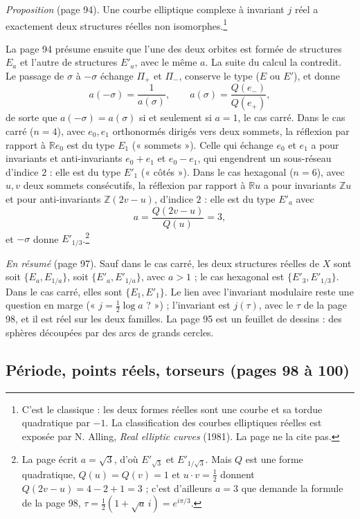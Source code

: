 \documentclass[11pt,a4paper]{article}
\begin{document}
\emph{Proposition} (page 94). Une courbe elliptique complexe à invariant $j$
réel a exactement deux structures réelles non isomorphes.\footnote{C'est le
classique : les deux formes réelles sont une courbe et sa tordue
quadratique par $-1$. La classification des courbes elliptiques réelles est
exposée par N. Alling, \emph{Real elliptic curves} (1981). La page ne la
cite pas.}

La page 94 présume ensuite que l'une des deux orbites est formée de
structures $E_a$ et l'autre de structures $E'_a$, avec le même $a$. La
suite du calcul la contredit. Le passage de $\sigma$ à $-\sigma$ échange
$\Pi_{+}$ et $\Pi_{-}$, conserve le type ($E$ ou $E'$), et donne
\[
a(-\sigma) = \frac{1}{a(\sigma)}, \qquad a(\sigma) =
\frac{Q(e_{-})}{Q(e_{+})},
\]
de sorte que $a(-\sigma) = a(\sigma)$ si et seulement si $a = 1$, le cas
carré. Dans le cas carré ($n = 4$), avec $e_0, e_1$ orthonormés dirigés vers
deux sommets, la réflexion par rapport à $\mathbb{R}e_0$ est du type $E_1$
(« sommets »). Celle qui échange $e_0$ et $e_1$ a pour invariants et
anti-invariants $e_0 + e_1$ et $e_0 - e_1$, qui engendrent un sous-réseau
d'indice $2$ : elle est du type $E'_1$ (« côtés »). Dans le cas hexagonal
($n = 6$), avec $u, v$ deux sommets consécutifs, la réflexion par rapport à
$\mathbb{R}u$ a pour invariants $\mathbb{Z}u$ et pour anti-invariants
$\mathbb{Z}(2v - u)$, d'indice $2$ : elle est du type $E'_a$ avec
\[
a = \frac{Q(2v - u)}{Q(u)} = 3,
\]
et $-\sigma$ donne $E'_{1/3}$.\footnote{La page écrit $a = \sqrt{3}$, d'où
$E'_{\sqrt{3}}$ et $E'_{1/\sqrt3}$. Mais $Q$ est une forme quadratique,
$Q(u) = Q(v) = 1$ et $u\cdot v = \frac12$ donnent $Q(2v - u) = 4 - 2 + 1 =
3$ ; c'est d'ailleurs $a = 3$ que demande la formule de la page 98,
$\tau = \frac12(1 + \sqrt{a}\, i) = e^{i\pi/3}$.}

\emph{En résumé} (page 97). Sauf dans le cas carré, les deux structures
réelles de $X$ sont soit $\{E_a, E_{1/a}\}$, soit $\{E'_a, E'_{1/a}\}$, avec
$a > 1$ ; le cas hexagonal est $\{E'_3, E'_{1/3}\}$. Dans le cas carré, elles
sont $\{E_1, E'_1\}$. Le lien avec l'invariant modulaire reste une question
en marge (« $j = \frac12 \log a$ ? ») ; l'invariant est $j(\tau)$, avec le
$\tau$ de la page 98, et il est réel sur les deux familles. La page 95 est un
feuillet de dessins : des sphères découpées par des arcs de grands cercles.

\subsection*{Période, points réels, torseurs (pages 98 à 100)}
\end{document}
